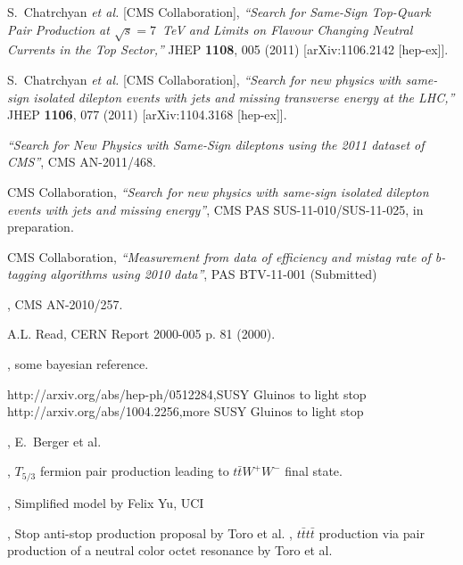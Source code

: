 \begin{thebibliography}{99}

  S.~Chatrchyan {\it et al.}  [CMS Collaboration],
  {\it ``Search for Same-Sign Top-Quark Pair Production at $\sqrt{s} = 7$~TeV 
	and Limits on Flavour Changing Neutral Currents in the Top Sector,''}
  JHEP {\bf 1108}, 005 (2011)
  [arXiv:1106.2142 [hep-ex]].

  S.~Chatrchyan {\it et al.}  [CMS Collaboration],
  {\it ``Search for new physics with same-sign isolated dilepton 
	events with jets and missing transverse energy at the LHC,''}
  JHEP {\bf 1106}, 077 (2011)
  [arXiv:1104.3168 [hep-ex]].

 {{\it ``Search for New Physics with Same-Sign dileptons using the 2011 dataset of CMS''}}, 
  CMS AN-2011/468.

 CMS Collaboration, {{\it ``Search for new physics with same-sign isolated 
	dilepton events with jets and missing energy''}}, 
  CMS PAS SUS-11-010/SUS-11-025, in preparation.

 CMS Collaboration, {{\it ``Measurement from data of efficiency and mistag rate of 
	b-tagging algorithms using 2010 data''}}, PAS BTV-11-001 (Submitted)

, CMS AN-2010/257.

 {A.L. Read, CERN Report 2000-005 p. 81 (2000).}

, some bayesian reference.

 { http://arxiv.org/abs/hep-ph/0512284},{SUSY Gluinos to light stop}
 { http://arxiv.org/abs/1004.2256},{more SUSY Gluinos to light stop}

, {E.~Berger et al.}

, { $T_{5/3}$ fermion pair production leading to $t\bar{t}W^+W^-$ final state.}

,{ Simplified model by Felix Yu, UCI}

, { Stop anti-stop production proposal by Toro et al. } 
, { $t\bar{t}t\bar{t}$ production via pair production of a neutral color octet resonance by Toro et al. } 


\end{thebibliography}
